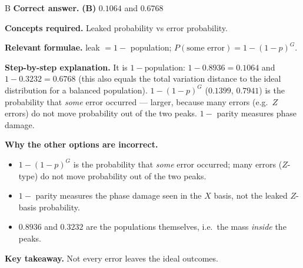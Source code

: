 \documentclass[11pt,a4paper]{article}
\newcommand{\qsep}{\par\vspace{2pt}{\color{black!15}\hrule}\vspace{4pt}}
\begin{document}
\begin{solbox}{B}
\textbf{\color{brand}Correct answer.} \textcolor{okgreen}{\textbf{(B)}} $0.1064$ and $0.6768$

\textbf{\color{brand}Concepts required.} Leaked probability vs error probability.

\textbf{\color{brand}Relevant formulae.} leak $= 1 - $ population; $P(\text{some error}) = 1 - (1-p)^G$.

\textbf{\color{brand}Step-by-step explanation.} It is $1 - \text{population}$: $1 - 0.8936 = 0.1064$ and $1 - 0.3232 = 0.6768$ (this also equals the total variation distance to the ideal distribution
for a balanced population). $1 - (1-p)^G$ ($0.1399$, $0.7941$) is the probability that \emph{some} error occurred --- larger, because many errors (e.g.\ $Z$ errors) do
not move probability out of the two peaks. $1 - $ parity measures phase damage.

\textbf{\color{brand}Why the other options are incorrect.}
\begin{itemize}[leftmargin=2.4em, itemsep=1pt, topsep=2pt]
\item[\textbf{(A)}] $1 - (1-p)^G$ is the probability that \emph{some} error occurred; many errors ($Z$-type) do not move probability out of the two peaks.
\item[\textbf{(C)}] $1 - $ parity measures the phase damage seen in the $X$ basis, not the leaked $Z$-basis probability.
\item[\textbf{(D)}] $0.8936$ and $0.3232$ are the populations themselves, i.e.\ the mass \emph{inside} the peaks.
\end{itemize}
\textbf{\color{brand}Key takeaway.} Not every error leaves the ideal outcomes.
\end{solbox}
\qsep
\end{document}
